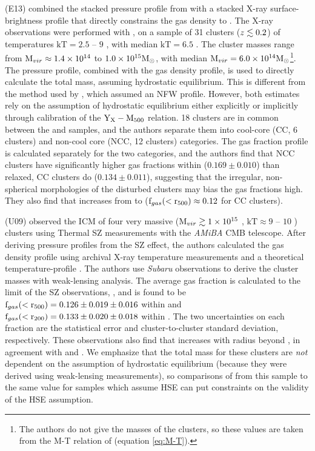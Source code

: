 \textbf{\citet{Eckert2013b}} (E13) combined the stacked pressure profile
from \citet{PlanckIntV} with a stacked X-ray surface-brightness
profile that directly constrains the gas density to \rtwo{}. The X-ray
observations were performed with \Rosat{}, on a sample of 31 clusters
($z\lesssim0.2$) of temperatures $\textrm{kT} = 2.5$ -- $9$ \keV, with
median $\textrm{kT} = 6.5$ \keV. The cluster masses range from $\textrm{M\ensuremath{_{vir}}}
\approx 1.4 \times 10^{14}$ to $1.0 \times 10^{15} \textrm{M}_\odot$, with median $\textrm{M\ensuremath{_{vir}}} =
6.0\times 10^{14} \textrm{M}_\odot$\footnote{The authors do not give the masses of
  the clusters, so these values are taken from the M-T relation of
  \citet{Vikhlinin2006} (equation \ref{eq:M-T}).}. The \Planck{}
pressure profile, combined with the gas density profile, is used to
directly calculate the total mass, assuming hydrostatic
equilibrium. This is different from the method used by
\citet{PlanckIntV}, which assumed an NFW profile. However, both
estimates rely on the assumption of hydrostatic equilibrium either
explicitly or implicitly through calibration of the
$\textrm{Y}_\textrm{X}-\textrm{M\ensuremath{_{500}}}$ relation. 18
clusters are in common between the \Rosat{} and \Planck{} samples, and
the authors separate them into cool-core (CC, 6 clusters) and
non-cool core (NCC, 12 clusters) categories. The gas fraction profile
is calculated separately for the two categories, and the authors find
that NCC clusters have significantly higher gas fractions within
\rtwo{} ($0.169 \pm 0.010$) than relaxed, CC clusters do ($0.134\pm
0.011$), suggesting that the irregular, non-spherical morphologies of
the disturbed clusters may bias the gas fractions high. They also find
that \fg{} increases from \rfive{} to \rtwo{} ($\textrm{f\ensuremath{_{gas}}}(<\textrm{r\ensuremath{_{500}}}) \approx
0.12$ for CC clusters). 

\textbf{\citet{Umetsu2009}} (U09) observed the ICM of four very massive
($\textrm{M\ensuremath{_{vir}}} \gtrsim 1\times 10^{15}$ \Msun, $\textrm{kT} \approx 9$ -- $10$ \keV)
clusters using Thermal SZ measurements with the \textit{AMiBA} CMB
telescope. After deriving pressure profiles from the SZ effect, the
authors calculated the gas density profile using archival X-ray
temperature measurements and a theoretical temperature-profile
\citep{Komatsu2001}. The authors use \textit{Subaru} observations to
derive the cluster masses with weak-lensing analysis. The average gas
fraction is calculated to the limit of the SZ observations, \rtwo, and
is found to be $\textrm{f\ensuremath{_{gas}}}(<\textrm{r\ensuremath{_{500}}}) = 0.126 \pm 0.019 \pm 0.016$ within
\rfive{} and $\textrm{f\ensuremath{_{gas}}}(<\textrm{r\ensuremath{_{200}}}) = 0.133 \pm 0.020 \pm 0.018$ within
\rtwo{}. The two uncertainties on each fraction are the statistical
error and cluster-to-cluster standard deviation, respectively. These
observations also find that \fg{} increases with radius beyond
\rfive{}, in agreement with \citet{PlanckIntV} and
\citet{Eckert2013b}. We emphasize that the total mass for these
clusters are \textit{not} dependent on the assumption of hydrostatic
equilibrium (because they were derived using weak-lensing
measurements), so comparisons of \fg{} from this sample to the same
value for samples which assume HSE can put constraints on the validity
of the HSE assumption.

